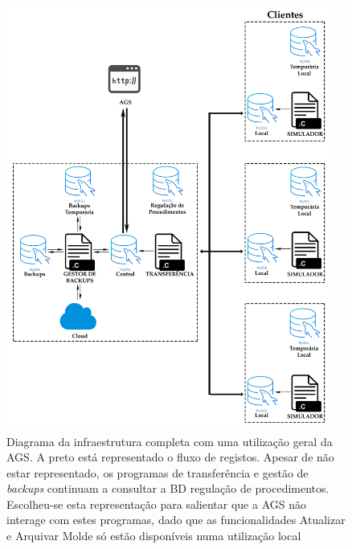 \documentclass[11pt,twoside,a4paper]{report}
\begin{document}
\begin{figure}
	\vspace{0cm}
	\begin{center}
		\includegraphics[width=0.95\textwidth]{Esquema_Projeto_Total02} %
		\caption[Diagrama da infraestrutura completa com uma utilização geral da AGS]{Diagrama da infraestrutura completa com uma utilização geral da AGS. A preto está representado o fluxo de registos. Apesar de não estar representado, os programas de transferência e gestão de \textit{backups} continuam a consultar a BD regulação de procedimentos. Escolheu-se esta representação para salientar que a AGS não interage com estes programas, dado que as funcionalidades Atualizar e Arquivar Molde só estão disponíveis numa utilização local}
		\label{fig:infra_total2}
	\end{center}
\end{figure}
\end{document}
